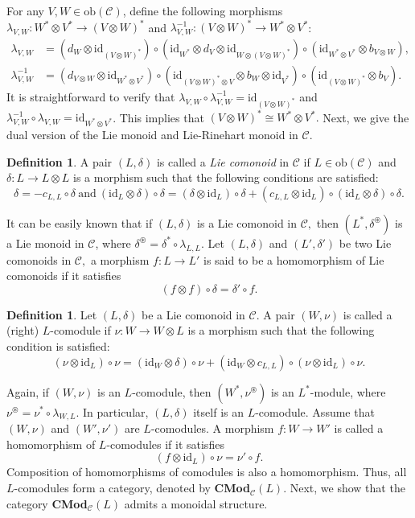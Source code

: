 \documentclass[11pt]{amsart}
\newcommand{\calC}{\mathcal{C}}
\newcommand{\ob}{\mathrm{ob}}
\newcommand{\id}{\mathrm{id}}
\theoremstyle{definition}
\newtheorem{defi}[theo]{Definition}
\numberwithin{equation}{section}
\begin{document}
For any $V,W\in \ob(\calC)$, define the following morphisms $\lambda_{V,W}:W^*\otimes V^* \to (V\otimes W)^*$ and $\lambda_{V,W}^{-1}:(V\otimes W)^* \to W^* \otimes V^*$:
\begin{align*}
			\lambda_{V,W}&=(d_W \otimes \mathrm{id}_{(V\otimes W)^*}) \circ (\mathrm{id}_{W^*} \otimes d_V \otimes \mathrm{id}_{W\otimes (V\otimes W)^*}) \circ (\mathrm{id}_{W^* \otimes V^*} \otimes b_{V\otimes W}), \\
			\lambda_{V,W}^{-1}&= (d_{V\otimes W}\otimes \mathrm{id}_{W^* \otimes V^*} ) \circ (\mathrm{id}_{(V\otimes W)^*\otimes V} \otimes b_W\otimes \mathrm{id}_{V^*}) \circ (\mathrm{id}_{(V\otimes W)^*} \otimes b_V).
\end{align*}
It is straightforward to verify that $\lambda_{V,W} \circ \lambda_{V,W}^{-1}=\id_{(V\otimes W)^*}$ and $\lambda_{V,W}^{-1}\circ \lambda_{V,W}=\id_{W^* \otimes V^*}$. This implies that $(V\otimes W)^* \cong W^* \otimes V^*.$
Next, we give the dual version of the Lie monoid and Lie-Rinehart monoid in $\calC.$
\begin{defi}
A pair $(L, \delta)$ is called a \emph{Lie comonoid}  in $\calC$ if $L\in \ob(\calC)$ and $\delta : L \rightarrow L\otimes L$ is a morphism such that the following conditions are satisfied:
\[\delta= -c_{L,L} \circ \delta \ \mathrm{and} \ (\id_L\otimes \delta) \circ \delta= (\delta \otimes \id_L) \circ \delta+(c_{L,L} \otimes \id_L) \circ (\id_L \otimes \delta) \circ \delta.   \] 
\end{defi}
It can be easily known that if $(L,\delta)$ is a Lie comonoid in $\calC,$ then $\left(L^*, \delta^{\circledast}  \right)$ is a Lie monoid in $\calC$, where $\delta^{\circledast}=\delta^* \circ \lambda_{L,L}$.
Let $(L,\delta)$ and $(L',\delta')$ be two Lie comonoids in $\calC,$ a morphism $f:L\to L'$ is said to be a homomorphism of Lie comonoids if it satisfies 
\[(f\otimes f) \circ \delta =\delta' \circ f.   \]
\begin{defi}
Let $(L,\delta)$ be a Lie comonoid in $\calC$. A pair $(W,\nu )$ is called a (right) $L$-comodule if $\nu: W \to W\otimes L$ is a morphism such that the following condition is satisfied:
\[ (\nu \otimes \id_L) \circ \nu= (\id_W \otimes \delta ) \circ \nu + (\id_W \otimes c_{L,L})\circ (\nu \otimes \id_L) \circ \nu.  \]
\end{defi}
Again, if $(W,\nu)$ is an $L$-comodule, then $(W^*, \nu^{\circledast})$ is an $L^*$-module, where $\nu^{\circledast}=\nu^* \circ \lambda_{W,L}$. 
In particular, $(L,\delta)$ itself is an $L$-comodule. 
Assume that $(W,\nu)$ and $(W',\nu')$ are $L$-comodules. A morphism $f:W \to W'$ is called a homomorphism of $L$-comodules if it satisfies
\[(f \otimes \id_L) \circ \nu = \nu' \circ f.  \]
Composition of homomorphisms of comodules is also a homomorphism. Thus, all $L$-comodules form a category, denoted by {\bf CMod}$_{\calC}(L)$.
Next, we show that the category {\bf CMod}$_{\calC}(L)$ admits a monoidal structure.
		
\end{document}
